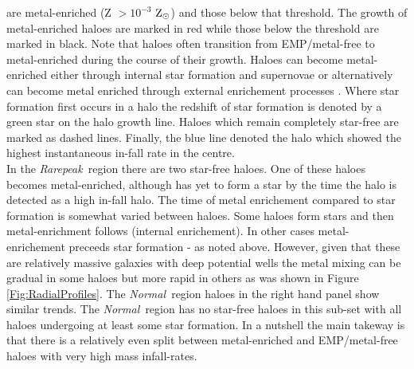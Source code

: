 \documentclass[graphics, twocolumn, usenatbib]{mn2e}
\newcommand{\zsolarc} {$\rm{Z_{\odot}}$}
\newcommand{\rarepeak} {\textit{Rarepeak~}}
\newcommand{\normal} {\textit{Normal~}}
\begin{document}
are metal-enriched (Z $> 10^{-3}$ \zsolarc) and those below that threshold. The growth of
metal-enriched haloes are marked in red while those below the threshold are marked in black. Note
that haloes often transition from EMP/metal-free to metal-enriched during the course of their growth. 
Haloes can become metal-enriched either through internal star formation and
supernovae or alternatively can become metal enriched through external enrichement processes
\citep[e.g.][]{Smith_2015}. Where star formation first
occurs in a halo the redshift of star formation is denoted by a green star on the halo growth line. 
Haloes which remain completely star-free are marked as dashed lines. Finally, the blue line denoted
the halo which showed the highest instantaneous in-fall rate in the centre. \\
\indent In the \rarepeak region there are two
star-free haloes. One of these haloes becomes metal-enriched, although has yet to form
a star by the time the halo is detected as a high in-fall halo. The time of metal enrichement
compared to star formation is somewhat varied between haloes. Some haloes form stars and then
metal-enrichment follows (internal enrichement). In other cases metal-enrichement preceeds
star formation - as noted above.
However, given that these are relatively massive galaxies with deep potential wells
the metal mixing can be gradual in some haloes but more rapid in others as was shown in Figure
\ref{Fig:RadialProfiles}. The \normal region haloes in the right hand panel show similar trends.
The \normal region has no star-free haloes in this sub-set with all haloes undergoing at
least some star formation. In a nutshell the main takeway is that there is a relatively even split
between metal-enriched and EMP/metal-free haloes with very high mass infall-rates. 
\end{document}
